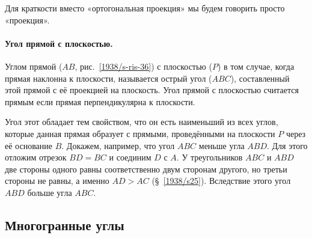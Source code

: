 Для краткости вместо «ортогональная проекция» мы будем говорить просто «проекция».

\paragraph{Угол прямой с плоскостью.}\label{1938/s48}
Углом прямой ($AB$, рис.~\ref{1938/s-ris-36}) с плоскостью ($P$) в том случае, когда прямая наклонна к плоскости, называется острый угол ($ABC$), составленный этой прямой с её проекцией на плоскость.
Угол прямой с плоскостью считается прямым если прямая перпендикулярна к плоскости.

Угол этот обладает тем свойством, что он есть наименьший из всех углов, которые данная прямая образует с прямыми, проведёнными на плоскости $P$ через её основание $B$.
Докажем, например, что угол $ABC$ меньше угла $ABD$.
Для этого отложим отрезок $BD=BC$ и соединим $D$ с $A$.
У треугольников $ABC$ и $ABD$ две стороны одного равны соответственно двум сторонам другого, но третьи стороны не равны, а именно $AD>AC$ (§~\ref{1938/s25}).
Вследствие этого угол $ABD$ больше угла $ABC$.

\subsection*{Многогранные углы}

